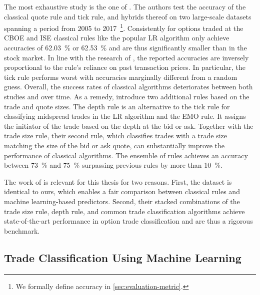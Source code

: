 The most exhaustive study is the one of \textcite[1--39]{grauerOptionTradeClassification2022}. The authors test the accuracy of the classical quote rule and tick rule, and hybrids thereof on two large-scale datasets spanning a period from 2005 to 2017~\footnote{We formally define accuracy in \cref{sec:evaluation-metric}.}. Consistently for options traded at the \gls{CBOE} and \gls{ISE} classical rules like the popular \gls{LR}  algorithm only achieve accuracies of \SI{62.03}{\percent} or \SI{62.53}{\percent} and are thus significantly smaller than in the stock market. In line with the research of \textcite[886]{savickasInferringDirectionOption2003}, the reported accuracies are inversely proportional to the rule's reliance on past transaction prices. In particular, the tick rule performs worst with accuracies marginally different from a random guess. Overall, the success rates of classical algorithms deteriorates between both studies and over time. As a remedy, \textcite[14--17]{grauerOptionTradeClassification2022} introduce two additional rules based on the trade and quote sizes. The depth rule is an alternative to the tick rule for classifying midspread trades in the \gls{LR}  algorithm and the \gls{EMO} rule. It assigns the initiator of the trade based on the depth at the bid or ask. Together with the trade size rule, their second rule, which classifies trades with a trade size matching the size of the bid or ask quote, can substantially improve the performance of classical algorithms. The ensemble of rules achieves an accuracy between \SI{73}{\percent} and \SI{75}{\percent} surpassing previous rules by more than \SI{10}{\percent}.


The work of \textcite[1--39]{grauerOptionTradeClassification2022} is relevant for this thesis for two reasons. First, the dataset is identical to ours, which enables a fair comparison between classical rules and machine learning-based predictors. Second, their stacked combinations of the trade size rule, depth rule, and common trade classification algorithms achieve state-of-the-art performance in option trade classification and are thus a rigorous benchmark.

\subsection{Trade Classification Using Machine Learning}
\label{sec:trade-classification-using-machine-learning}

